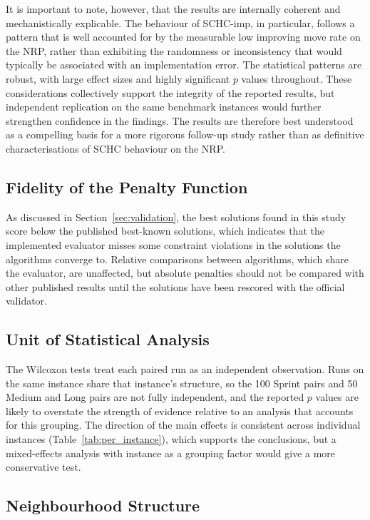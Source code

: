 \documentclass[12pt, a4paper, oneside]{report}
\begin{document}
It is important to note, however, that the results are internally
coherent and mechanistically explicable. The behaviour of SCHC-imp,
in particular, follows a pattern that is well accounted for by the
measurable low improving move rate on the NRP, rather than
exhibiting the randomness or inconsistency that would typically be
associated with an implementation error. The statistical patterns
are robust, with large effect sizes and highly significant $p$ values
throughout. These considerations collectively support the integrity
of the reported results, but independent replication on the same
benchmark instances would further strengthen confidence in the
findings. The results are therefore best understood as a compelling
basis for a more rigorous follow-up study rather than as definitive
characterisations of SCHC behaviour on the NRP.

\subsection{Fidelity of the Penalty Function}
\label{sec:disc_evaluator}

As discussed in Section~\ref{sec:validation}, the best solutions
found in this study score below the published best-known solutions,
which indicates that the implemented evaluator misses some constraint
violations in the solutions the algorithms converge to. Relative
comparisons between algorithms, which share the evaluator, are
unaffected, but absolute penalties should not be compared with other
published results until the solutions have been rescored with the
official validator.

\subsection{Unit of Statistical Analysis}
\label{sec:disc_stats_unit}

The Wilcoxon tests treat each paired run as an independent
observation. Runs on the same instance share that instance's
structure, so the 100 Sprint pairs and 50 Medium and Long pairs are
not fully independent, and the reported $p$ values are likely to
overstate the strength of evidence relative to an analysis that
accounts for this grouping. The direction of the main effects is
consistent across individual instances (Table~\ref{tab:per_instance}),
which supports the conclusions, but a mixed-effects analysis with
instance as a grouping factor would give a more conservative test.

\subsection{Neighbourhood Structure}
\label{sec:disc_neighbourhood}
\end{document}
